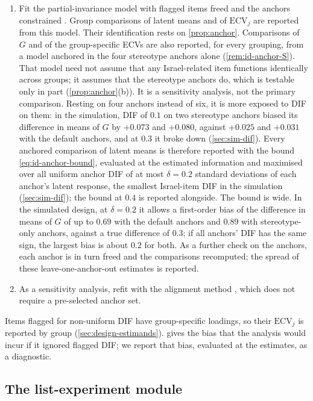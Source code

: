 \begin{enumerate}[1.]
  \item Fit the partial-invariance model with flagged items freed and the anchors constrained \citep{byrne1989}. Group comparisons of latent means and of $\mathrm{ECV}_j$ are reported from this model. Their identification rests on \cref{prop:anchor}. Comparisons of $G$ and of the group-specific ECVs are also reported, for every grouping, from a model anchored in the four stereotype anchors alone (\cref{rem:id-anchor-S}). That model need not assume that any Israel-related item functions identically across groups; it assumes that the stereotype anchors do, which is testable only in part (\cref{prop:anchor}(b)). It is a sensitivity analysis, not the primary comparison. Resting on four anchors instead of six, it is more exposed to DIF on them: in the simulation, DIF of $0.1$ on two stereotype anchors biased its difference in means of $G$ by $+0.073$ and $+0.080$, against $+0.025$ and $+0.031$ with the default anchors, and at $0.3$ it broke down (\cref{sec:sim-dif}). Every anchored comparison of latent means is therefore reported with the bound \eqref{eq:id-anchor-bound}, evaluated at the estimated information and maximised over all uniform anchor DIF of at most $\delta=0.2$ standard deviations of each anchor's latent response, the smallest Israel-item DIF in the simulation (\cref{sec:sim-dif}); the bound at $0.4$ is reported alongside. The bound is wide. In the simulated design, at $\delta=0.2$ it allows a first-order bias of the difference in means of $G$ of up to $0.69$ with the default anchors and $0.89$ with stereotype-only anchors, against a true difference of $0.3$; if all anchors' DIF has the same sign, the largest bias is about $0.2$ for both. As a further check on the anchors, each anchor is in turn freed and the comparisons recomputed; the spread of these leave-one-anchor-out estimates is reported.
  \item As a sensitivity analysis, refit with the alignment method \citep{asparouhov2014}, which does not require a pre-selected anchor set.
\end{enumerate}
Items flagged for non-uniform DIF have group-specific loadings, so their $\mathrm{ECV}_j$ is reported by group (\cref{sec:design-estimands}).  gives the bias that the analysis would incur if it ignored flagged DIF; we report that bias, evaluated at the estimates, as a diagnostic.

\subsection{The list-experiment module}\label{sec:design-list}

